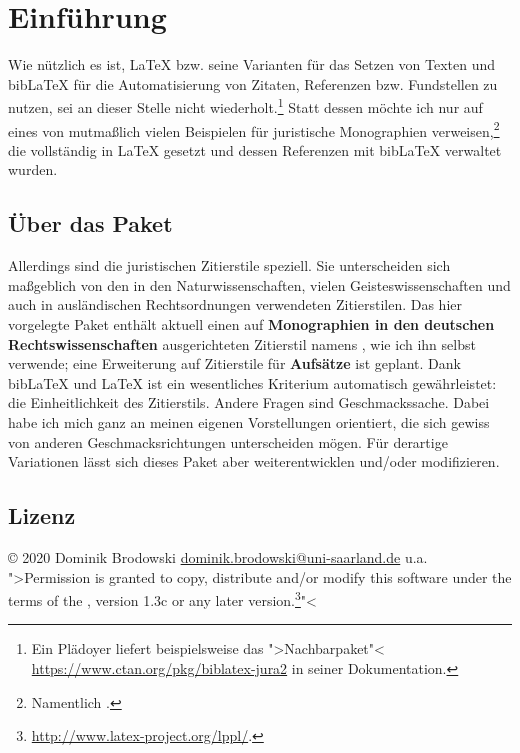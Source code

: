 \documentclass{ltxdockit}[2010/09/26]
\newcommand{\biblatex}{bib\LaTeX}
\begin{document}
\printtitlepage
\tableofcontents

\section{Einführung}

Wie nützlich es ist, \LaTeX{} bzw. seine Varianten für das Setzen von Texten und \biblatex{} für die Automatisierung von Zitaten, Referenzen bzw. Fundstellen zu nutzen, sei an dieser Stelle nicht wiederholt.\footnote{Ein Plädoyer liefert beispielsweise das ">Nachbarpaket"< \url{https://www.ctan.org/pkg/biblatex-jura2} in seiner Dokumentation.} Statt dessen möchte ich nur auf eines von mutmaßlich vielen Beispielen für juristische Monographien verweisen,\footnote{Namentlich \cite{Brodowski:2016}.} die vollständig in \LaTeX{} gesetzt und dessen Referenzen mit \biblatex{} verwaltet wurden.

\subsection{Über das Paket }

Allerdings sind die juristischen Zitierstile speziell. Sie unterscheiden sich maßgeblich von den in den Naturwissenschaften, vielen Geisteswissenschaften und auch in ausländischen Rechtsordnungen verwendeten Zitierstilen. Das hier vorgelegte Paket enthält aktuell einen auf \textbf{Monographien in den deutschen Rechtswissenschaften} ausgerichteten Zitierstil namens , wie ich ihn selbst verwende; eine Erweiterung auf Zitierstile für \textbf{Aufsätze} ist geplant. Dank \biblatex{} und \LaTeX{} ist ein wesentliches Kriterium automatisch gewährleistet: die Einheitlichkeit des Zitierstils. Andere Fragen sind Geschmackssache. Dabei habe ich mich ganz an meinen eigenen Vorstellungen orientiert, die sich gewiss von anderen Geschmacksrichtungen unterscheiden mögen. Für derartige Variationen lässt sich dieses Paket aber weiterentwicklen und/oder modifizieren.

\subsection{Lizenz}

\copyright{} 2020 Dominik Brodowski \url{dominik.brodowski@uni-saarland.de} u.a. ">Permission is granted to copy, distribute and\slash or modify this software under the terms of the \lppl, version 1.3c or any later version.\footnote{\url{http://www.latex-project.org/lppl/}.}"<
\end{document}
